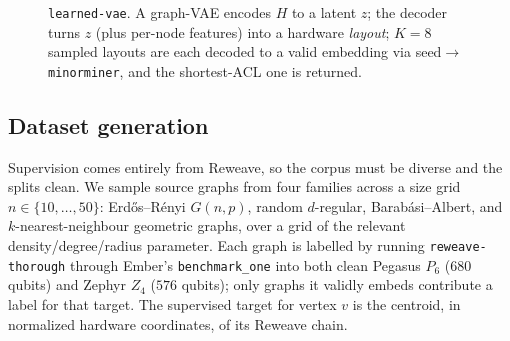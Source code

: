 \documentclass[acmsmall,anonymous,nonacm]{acmart}
\begin{document}
\begin{figure}[t]
\centering
{}
\caption{\texttt{learned-vae}. A graph-VAE encodes $H$ to a latent $z$; the decoder
turns $z$ (plus per-node features) into a hardware \emph{layout}; $K{=}8$ sampled
layouts are each decoded to a valid embedding via seed$\to$\texttt{minorminer}, and
the shortest-ACL one is returned.}
\label{fig:vae}
\end{figure}

\subsection{Dataset generation}
\label{sec:learn-data}

Supervision comes entirely from Reweave, so the corpus must be diverse and the
splits clean. We sample source graphs from four families across a size grid
$n\in\{10,\dots,50\}$: Erd\H{o}s--R\'enyi $G(n,p)$, random $d$-regular,
Barab\'asi--Albert, and $k$-nearest-neighbour geometric graphs, over a grid of the
relevant density/degree/radius parameter. Each graph is labelled by running
\texttt{reweave-thorough} through Ember's \texttt{benchmark\_one} into both
clean Pegasus $P_6$ ($680$ qubits) and Zephyr $Z_4$ ($576$ qubits); only graphs it
validly embeds contribute a label for that target. The supervised target for vertex
$v$ is the centroid, in normalized hardware coordinates, of its Reweave chain.
\end{document}
